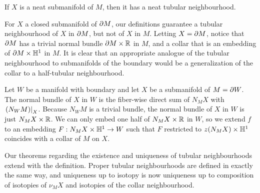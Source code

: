 \begin{theorem}
	If $X$ is a neat submanifold of $M$, then it has a neat tubular neighbourhood.
\end{theorem}

For $X$ a closed submanifold of $\partial M$, our definitions guarantee a tubular neighbourhood of $X$ in $\partial M$, but not of $X$ in $M$.
Letting $X=\partial M$, notice that $\partial M$ has a trivial normal bundle $\partial M\times \mathbb{R}$ in $M$, and a collar that is an embedding of $\partial M\times\mathbb{H}^1$ in $M$.
It is clear that an appropriate analogue of the tubular neighbourhood to submanifolds of the boundary would be a generalization of the collar to a half-tubular neighbourhood.

\begin{defn}
	\label{def:halfneighbourhood}
	Let $W$ be a manifold with boundary and let $X$ be a submanifold of $M=\partial W$.
	The normal bundle of $X$ in $W$ is the fiber-wise direct sum of $N_M X$ with $\left.(N_W M)\right|_{X}$.
	Because $N_W M$ is a trivial bundle, the normal bundle of $X$ in $W$ is just $N_M X\times \mathbb{R}$.
	We can only embed one half of $N_M X\times \mathbb{R}$ in $W$, so we extend $f$ to an embedding $F:N_M X\times \mathbb{H}^1\to W$ such that $F$ restricted to $z(N_M X)\times\mathbb{H}^1$ coincides with a collar of $M$ on $X$.
\end{defn}

Our theorems regarding the existence and uniqueness of tubular neighbourhoods extend with the definition.
Proper tubular neighbourhoods are defined in exactly the same way, and uniqueness up to isotopy is now uniqueness up to composition of isotopies of $\nu_M X$ and isotopies of the collar neighbourhood.